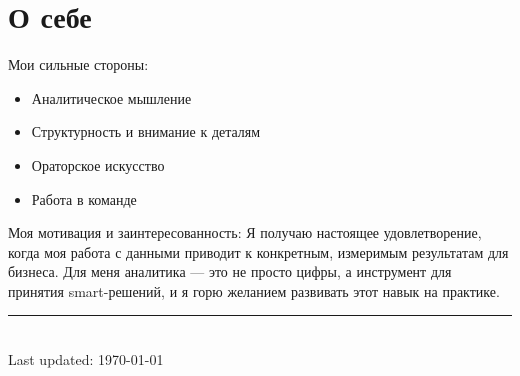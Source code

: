 \documentclass[12pt]{article}
\begin{document}
\section*{О себе}
\hspace{15pt}
Мои сильные стороны:
\begin{itemize}[before=\setlength{\baselineskip}{0pt}, itemsep=2pt]
    \item Аналитическое мышление
    \item Структурность и внимание к деталям
    \item Ораторское искусство
    \item Работа в команде
\end{itemize}
Моя мотивация и заинтересованность:
    Я получаю настоящее удовлетворение, когда моя работа с данными приводит к конкретным, измеримым результатам для бизнеса. Для меня аналитика — это не просто цифры, а инструмент для принятия smart-решений, и я горю желанием развивать этот навык на практике.

\centering
\rule{0.25\linewidth}{0.4pt}\\
\medskip
Last updated: \today
\end{document}
